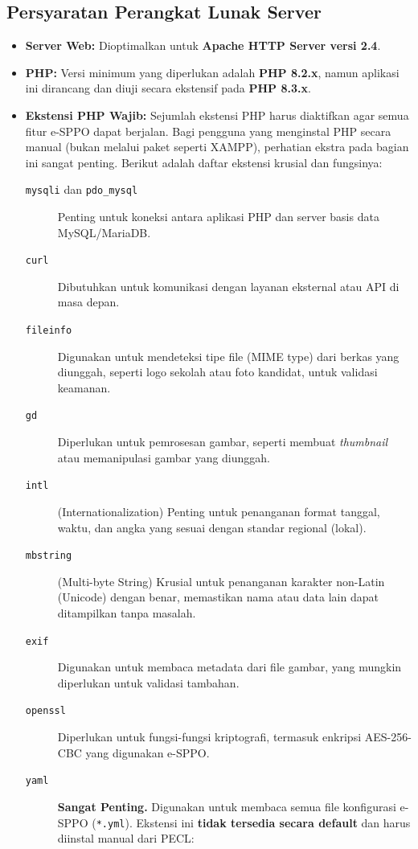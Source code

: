 \subsection{Persyaratan Perangkat Lunak Server}
\begin{itemize}
	\item \textbf{Server Web:} Dioptimalkan untuk \textbf{Apache HTTP Server versi 2.4}.
	\item \textbf{PHP:} Versi minimum yang diperlukan adalah \textbf{PHP 8.2.x}, namun aplikasi ini dirancang dan diuji secara ekstensif pada \textbf{PHP 8.3.x}.
	\item \textbf{Ekstensi PHP Wajib:} Sejumlah ekstensi PHP harus diaktifkan agar semua fitur e-SPPO dapat berjalan. Bagi pengguna yang menginstal PHP secara manual (bukan melalui paket seperti XAMPP), perhatian ekstra pada bagian ini sangat penting. Berikut adalah daftar ekstensi krusial dan fungsinya:
	\begin{description}
		\item[\texttt{mysqli} dan \texttt{pdo\_mysql}] Penting untuk koneksi antara aplikasi PHP dan server basis data MySQL/MariaDB.
		\item[\texttt{curl}] Dibutuhkan untuk komunikasi dengan layanan eksternal atau API di masa depan.
		\item[\texttt{fileinfo}] Digunakan untuk mendeteksi tipe file (MIME type) dari berkas yang diunggah, seperti logo sekolah atau foto kandidat, untuk validasi keamanan.
		\item[\texttt{gd}] Diperlukan untuk pemrosesan gambar, seperti membuat \textit{thumbnail} atau memanipulasi gambar yang diunggah.
		\item[\texttt{intl}] (Internationalization) Penting untuk penanganan format tanggal, waktu, dan angka yang sesuai dengan standar regional (lokal).
		\item[\texttt{mbstring}] (Multi-byte String) Krusial untuk penanganan karakter non-Latin (Unicode) dengan benar, memastikan nama atau data lain dapat ditampilkan tanpa masalah.
		\item[\texttt{exif}] Digunakan untuk membaca metadata dari file gambar, yang mungkin diperlukan untuk validasi tambahan.
		\item[\texttt{openssl}] Diperlukan untuk fungsi-fungsi kriptografi, termasuk enkripsi AES-256-CBC yang digunakan e-SPPO.
		\item[\texttt{yaml}] \textbf{Sangat Penting.} Digunakan untuk membaca semua file konfigurasi e-SPPO (\texttt{*.yml}). Ekstensi ini \textbf{tidak tersedia secara default} dan harus diinstal manual dari PECL:

\end{description}
\end{itemize}

